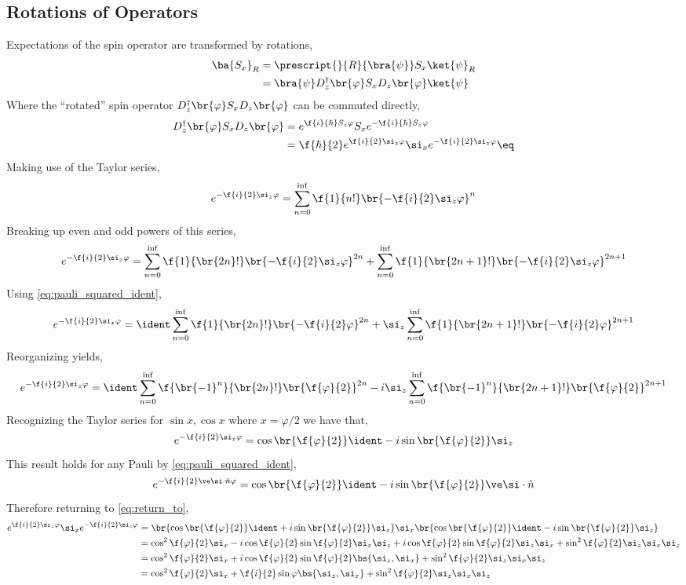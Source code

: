 \documentclass{article}
\begin{document}
\subsection{Rotations of Operators}
Expectations of the spin operator are transformed by rotations,
\begin{align*}
    \ba{S_x}_R &= \prescript{}{R}{\bra{\psi}} S_x \ket{\psi}_R \\
    &= \bra{\psi} D^{\dagger}_z\br{\varphi} S_x D_z\br{\varphi} \ket{\psi}
\end{align*}
Where the ``rotated'' spin operator $D^{\dagger}_z\br{\varphi} S_x D_z\br{\varphi}$ can be commuted directly,
\begin{align*}
    D^{\dagger}_z\br{\varphi} S_x D_z\br{\varphi} &= e^{\f{i}{\hbar} S_z \varphi } S_x e^{-\f{i}{\hbar} S_z \varphi } \\
    &= \f{\hbar}{2} e^{\f{i}{2} \si_z \varphi } \si_x e^{-\f{i}{2} \si_z \varphi } \eq \label{eq:return_to}
\end{align*}
Making use of the Taylor series,
\[ e^{-\f{i}{2} \si_z \varphi} = \sum_{n=0}^{\inf} \f{1}{n!}\br{-\f{i}{2} \si_z \varphi }^n \]
Breaking up even and odd powers of this series,
\[ e^{-\f{i}{2} \si_z \varphi} = \sum_{n=0}^{\inf} \f{1}{\br{2n}!}\br{-\f{i}{2} \si_z \varphi }^{2n} + \sum_{n=0}^{\inf} \f{1}{\br{2n + 1}!}\br{-\f{i}{2} \si_z \varphi }^{2n + 1} \]
Using \cref{eq:pauli_squared_ident},
\[ e^{-\f{i}{2} \si_z \varphi} = \ident \sum_{n=0}^{\inf} \f{1}{\br{2n}!}\br{-\f{i}{2} \varphi }^{2n} + \si_z\sum_{n=0}^{\inf} \f{1}{\br{2n + 1}!}\br{-\f{i}{2} \varphi }^{2n + 1} \]
Reorganizing yields,
\[ e^{-\f{i}{2} \si_z \varphi} = \ident \sum_{n=0}^{\inf} \f{\br{-1}^n}{\br{2n}!}\br{\f{\varphi}{2}  }^{2n} - i \si_z\sum_{n=0}^{\inf} \f{\br{-1}^n}{\br{2n + 1}!}\br{\f{\varphi}{2}}^{2n + 1} \]
Recognizing the Taylor series for $\sin x, \cos x$ where $x = \varphi / 2$ we have that,
\[ e^{-\f{i}{2} \si_z \varphi} =  \cos\br{\f{\varphi}{2}}\ident - i \sin\br{\f{\varphi}{2}} \si_z \]
This result holds for any Pauli by \cref{eq:pauli_squared_ident},
\[ e^{-\f{i}{2} \ve \si \cdot \hat n \varphi} =  \cos\br{\f{\varphi}{2}}\ident - i \sin\br{\f{\varphi}{2}} \ve \si \cdot \hat n \]
Therefore returning to \cref{eq:return_to},
\begin{align*}
    e^{\f{i}{2} \si_z \varphi } \si_x e^{-\f{i}{2} \si_z \varphi } &=
    \br{\cos\br{\f{\varphi}{2}}\ident + i \sin\br{\f{\varphi}{2}} \si_z} \si_x \br{\cos\br{\f{\varphi}{2}}\ident - i \sin\br{\f{\varphi}{2}} \si_z} \\
    &= \cos^2 \f{\varphi}{2} \si_x - i \cos \f{\varphi}{2} \sin \f{\varphi}{2} \si_x \si_z + i \cos \f{\varphi}{2} \sin \f{\varphi}{2} \si_z \si_x + \sin^2 \f{\varphi}{2} \si_z \si_x \si_z \\
    &= \cos^2 \f{\varphi}{2} \si_x + i \cos \f{\varphi}{2} \sin \f{\varphi}{2} \bs{\si_z, \si_x}+ \sin^2 \f{\varphi}{2} \si_z \si_x \si_z \\
    &= \cos^2 \f{\varphi}{2} \si_x + \f{i}{2} \sin \varphi \bs{\si_z, \si_x}+ \sin^2 \f{\varphi}{2} \si_z \si_x \si_z
\end{align*}
\end{document}
